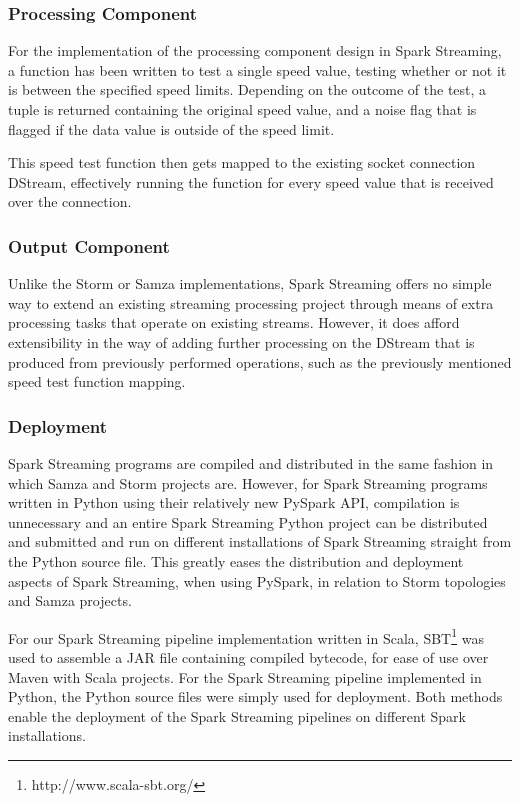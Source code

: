 \subsubsection{Processing Component}

For the implementation of the processing component design in Spark Streaming, a function has been written to test a single
speed value, testing whether or not it is between the specified speed limits. Depending on the outcome of the test,
a tuple is returned containing the original speed value, and a noise flag that is flagged if the data value is outside
of the speed limit.

This speed test function then gets mapped to the existing socket connection DStream, effectively running the function
for every speed value that is received over the connection.

\subsubsection{Output Component}

Unlike the Storm or Samza implementations, Spark Streaming offers no simple way to extend an existing streaming processing
project through means of extra processing tasks that operate on existing streams. However, it does afford extensibility
in the way of adding further processing on the DStream that is produced from previously performed operations, such
as the previously mentioned speed test function mapping.

\subsubsection{Deployment}

Spark Streaming programs are compiled and distributed in the same fashion in which Samza and Storm projects are. However,
for Spark Streaming programs written in Python using their relatively new PySpark API, compilation is unnecessary and an entire Spark
Streaming Python project can be distributed and submitted and run on different installations of Spark Streaming straight
from the Python source file. This greatly eases the distribution and deployment aspects of Spark Streaming, when using
PySpark, in relation to Storm topologies and Samza projects.

For our Spark Streaming pipeline implementation written in Scala, SBT\footnote{http://www.scala-sbt.org/} was used to assemble a JAR file containing compiled
bytecode, for ease of use over Maven with Scala projects. For the Spark Streaming pipeline implemented in Python, the
Python source files were simply used for deployment. Both methods enable the deployment of the Spark Streaming pipelines on
different Spark installations.

